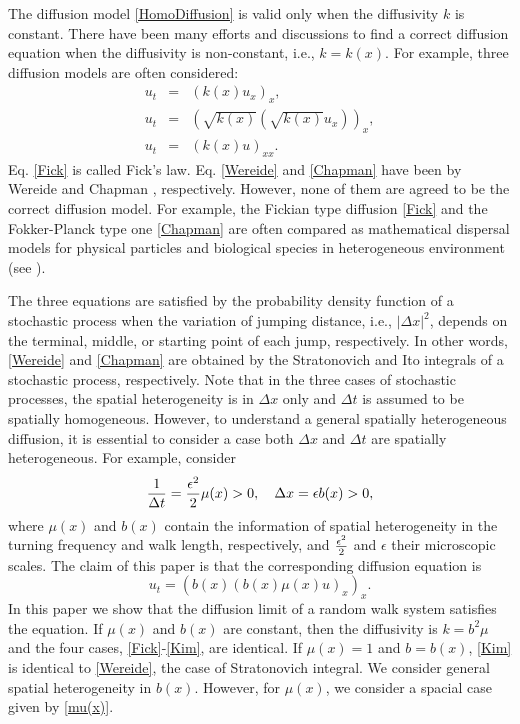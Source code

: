 \documentclass[11pt]{amsart}
\def\eps{\epsilon}
\def\x{{x}}
\begin{document}
The diffusion model \eqref{HomoDiffusion} is valid only when the diffusivity $k$ is constant. There have been many efforts and discussions to find a correct diffusion equation when the diffusivity is non-constant, i.e., $k=k(\x)$. For example, three diffusion models are often considered:
\begin{eqnarray}
\label{Fick} u_t &=& (k(\x)u_x)_x, \\
\label{Wereide} u_t &=& ( \sqrt{k(\x)}(\sqrt{k(\x)}u_x))_x, \\
\label{Chapman} u_t &=& (k(\x)u)_{xx}.
\end{eqnarray}
Eq. \eqref{Fick} is called Fick's law. Eq. \eqref{Wereide} and \eqref{Chapman} have been by Wereide \cite{Wereide1914} and Chapman \cite{Chapman1928}, respectively. However, none of them are agreed to be the correct diffusion model. For example, the Fickian type diffusion \eqref{Fick} and the Fokker-Planck type one \eqref{Chapman} are often compared as mathematical dispersal models for physical particles and biological species in heterogeneous environment (see \cite{Bengfort2016,Milligen}).

The three equations are satisfied by the probability density function of a stochastic process when the variation of jumping distance, i.e., $|\Delta x|^2$, depends on the terminal, middle, or starting point of each jump, respectively. In other words, \eqref{Wereide} and \eqref{Chapman} are obtained by the Stratonovich and Ito integrals of a stochastic process, respectively. Note that in the three cases of stochastic processes, the spatial heterogeneity is in $\Delta x$ only and $\Delta t$ is assumed to be spatially homogeneous. However, to understand a general spatially heterogeneous diffusion, it is essential to consider a case both $\Delta x$ and $\Delta t$ are spatially heterogeneous. For example, consider
\begin{equation*}
{1\over \Delta t}={\eps^2\over2}\mu(x)>0,\quad \Delta x=\eps b(x)>0,
\end{equation*}
where $\mu(x)$ and $b(x)$ contain the information of spatial heterogeneity in the turning frequency and walk length, respectively, and ${\eps^2\over2}$ and $\eps$ their microscopic scales. The claim of this paper is that the corresponding diffusion equation is
\begin{equation}\label{Kim}
u_t=(b(x)(b(x)\mu(x)u)_x)_x.
\end{equation}
In this paper we show that the diffusion limit of a random walk system satisfies the equation. If $\mu(x)$ and $b(x)$ are constant, then the diffusivity is $k={b^2\mu}$ and the four cases, \eqref{Fick}-\eqref{Kim}, are identical. If $\mu(x)=1$ and $b=b(x)$, \eqref{Kim} is identical to \eqref{Wereide}, the case of Stratonovich integral. We consider general spatial heterogeneity in $b(x)$. However, for $\mu(x)$, we consider a spacial case given by \eqref{mu(x)}.
\end{document}
